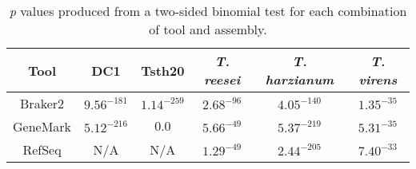 \begin{table}[h!]
  \begin{center}
    \begin{tabular}{|c|c|c|c|c|c|}
      \hline
      Tool & DC1 & Tsth20 & \textit{T. reesei} & \textit{T. harzianum} & \textit{T. virens} \\ \hline
      Braker2 & $9.56^{-181}$ & $1.14^{-259}$ & $2.68^{-96}$ & $4.05^{-140}$ & $1.35^{-35}$ \\ \hline
      GeneMark & $5.12^{-216}$ & $0.0$ & $5.66^{-49}$ & $5.37^{-219}$ & $5.31^{-35}$ \\ \hline
      RefSeq & N/A & N/A & $1.29^{-49}$ & $2.44^{-205}$ & $7.40^{-33}$ \\ \hline
    \end{tabular}
  \end{center}
  \caption{\textit{p} values produced from a two-sided binomial test
    for each combination of tool and assembly.}
  \label{table:gc-binomial}
\end{table}
